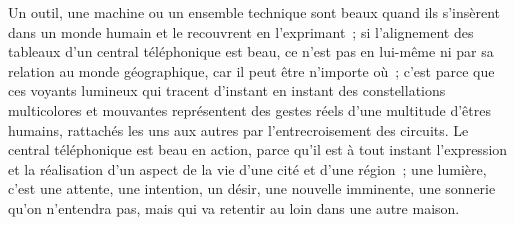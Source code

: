 \documentclass[11pt,twoside,openany]{book}
\newenvironment{lateiDocument}{}{}
\begin{document}
\begin{lateiDocument}
\begin{teiElement}[name={TEI},change={commons\_edition}]
\begin{teiElement}[name={text},type={book},xmlid={book}]
\begin{teiElement}[name={group},type={book},xmlid={book-001}]
\begin{teiElement}[name={group},type={section1},xmlid={section1-003}]
\begin{teiElement}
\begin{teiElement}[name={body},xmlid={body-011}]
\begin{teiCit}[xmlid={cit03-6}]
              \begin{teiQuote}
\lbrack{}U\rbrack{}n outil, une machine ou un ensemble technique sont beaux quand ils s’insèrent dans un monde humain et le recouvrent en l’exprimant ; si l’alignement des tableaux d’un central téléphonique est beau, ce n’est pas en lui-même ni par sa relation au monde géographique, car il peut être n’importe où ; c’est parce que ces voyants lumineux qui tracent d’instant en instant des constellations multicolores et mouvantes représentent des gestes réels d’une multitude d’êtres humains, rattachés les uns aux autres par l’entrecroisement des circuits. Le central téléphonique est beau en action, parce qu’il est à tout instant l’expression et la réalisation d’un aspect de la vie d’une cité et d’une région ; une lumière, c’est une attente, une intention, un désir, une nouvelle imminente, une sonnerie qu’on n’entendra pas, mais qui va retentir au loin dans une autre maison.
\end{teiQuote}
            

\end{teiCit}
\end{teiElement}
\end{teiElement}
\end{teiElement}
\end{teiElement}
\end{teiElement}
\end{teiElement}
\end{lateiDocument}
\end{document}
